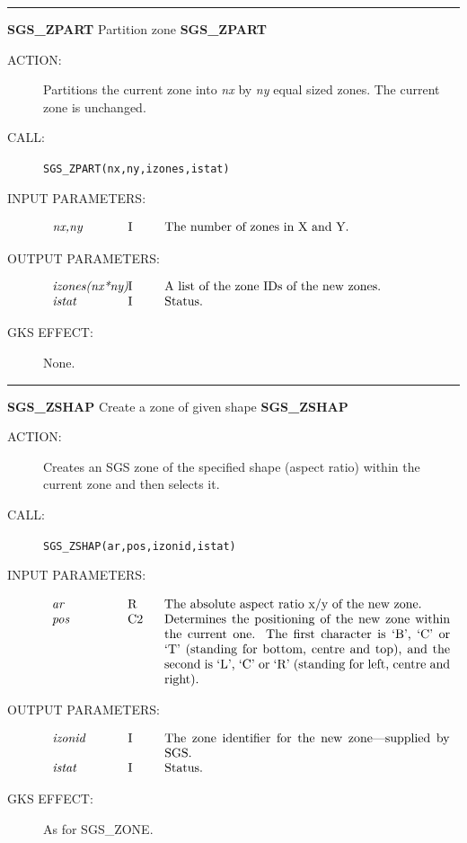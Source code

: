 \documentclass[11pt]{article}
\newcommand{\xlabel}[1]{}
\newcommand{\rthead}[2]{\rule{\textwidth}{0.3mm}
{\Large {\bf #1} \hfill #2 \hfill {\bf #1}}}
\newenvironment{params}%
{\[\begin{tabular}{p{0.14\textwidth}p{0.05\textwidth}p{0.66\textwidth}}}%
{\end{tabular}\]}
\newcommand{\rparams}[3]{{\em #1} &#2 &#3\\}
\newcommand{\rthead}[2]{\subsection{\label{#1}\xlabel{#1}#1 - #2}}
\newenvironment{params}{\begin{description}}{\end{description}}
\newcommand{\rparams}[3]{\item{{\em #1}} (#2) #3}
\begin{document}
\rthead{SGS\_ZPART}{Partition zone}
\begin{description}
\item [ACTION:]
Partitions the current zone into {\em nx}\/ by {\em ny}\/ equal sized zones.
The current zone is unchanged.
\item [CALL:]
{\tt SGS\_ZPART(nx,ny,izones,istat)}
\item [INPUT PARAMETERS:]
\begin{params}
\rparams{nx,ny}{I}{The number of zones in X and Y.}
\end{params}
\item [OUTPUT PARAMETERS:]
\begin{params}
\rparams{izones(nx*ny)}{I}{A list of the zone IDs of the new zones.}
\rparams{istat}{I}{Status.}
\end{params}
\item [GKS EFFECT:]
None.
\end{description}
\goodbreak

\rthead{SGS\_ZSHAP}{Create a zone of given shape}
\begin{description}
\item [ACTION:]
Creates an SGS zone of the specified shape (aspect ratio) within the current
zone and then selects it.
\item [CALL:]
{\tt SGS\_ZSHAP(ar,pos,izonid,istat)}
\item [INPUT PARAMETERS:]
\begin{params}
\rparams{ar}{R}{The absolute aspect ratio x/y of the new zone.}
\rparams{pos}{C2}{Determines the positioning of the new zone within the current
one. The first character is `B', `C' or `T' (standing for bottom, centre and
top), and the second is `L', `C' or `R' (standing for left, centre and right).}
\end{params}
\item [OUTPUT PARAMETERS:]
\begin{params}
\rparams{izonid}{I}{The zone identifier for the new zone---supplied by SGS.}
\rparams{istat}{I}{Status.}
\end{params}
\item [GKS EFFECT:]
As for SGS\_ZONE.
\end{description}
\goodbreak
\end{document}
